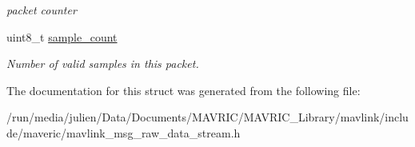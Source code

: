 \begin{DoxyCompactItemize}
\begin{DoxyCompactList}\small\item\em packet counter \end{DoxyCompactList}\item 
\hypertarget{struct____mavlink__raw__data__stream__t_a2fa1cb2b38863b7859027c73e741d6ff}{uint8\+\_\+t \hyperlink{struct____mavlink__raw__data__stream__t_a2fa1cb2b38863b7859027c73e741d6ff}{sample\+\_\+count}}\label{struct____mavlink__raw__data__stream__t_a2fa1cb2b38863b7859027c73e741d6ff}

\begin{DoxyCompactList}\small\item\em Number of valid samples in this packet. \end{DoxyCompactList}\end{DoxyCompactItemize}


The documentation for this struct was generated from the following file\+:\begin{DoxyCompactItemize}
\item 
/run/media/julien/\+Data/\+Documents/\+M\+A\+V\+R\+I\+C/\+M\+A\+V\+R\+I\+C\+\_\+\+Library/mavlink/include/maveric/mavlink\+\_\+msg\+\_\+raw\+\_\+data\+\_\+stream.\+h\end{DoxyCompactItemize}
